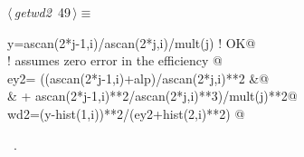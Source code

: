 \documentclass[10pt,a4paper,notitlepage]{article}
\begin{document}
\begin{flushleft} \small
\begin{minipage}{\linewidth}\label{scrap52}\raggedright\small
{} $\langle\,${\it getwd2}\nobreak\ {\footnotesize {49}}$\,\rangle\equiv$
\vspace{-1ex}
\begin{list}{}{} \item
\mbox{}\verb@            y=ascan(2*j-1,i)/ascan(2*j,i)/mult(j)   ! OK@\\
\mbox{}\verb@! assumes zero error in the efficiency    @\\
\mbox{}\verb@            ey2= ((ascan(2*j-1,i)+alp)/ascan(2*j,i)**2                  &@\\
\mbox{}\verb@     &           +  ascan(2*j-1,i)**2/ascan(2*j,i)**3)/mult(j)**2@\\
\mbox{}\verb@            wd2=(y-hist(1,i))**2/(ey2+hist(2,i)**2)                          @{\NWsep}
\end{list}
\vspace{-1.5ex}
\footnotesize
\begin{list}{}{\setlength{\itemsep}{-\parsep}\setlength{\itemindent}{-\leftmargin}}
\item \NWtxtMacroRefIn\ .

\item{}
\end{list}
\end{minipage}\vspace{4ex}
\end{flushleft}
\end{document}
